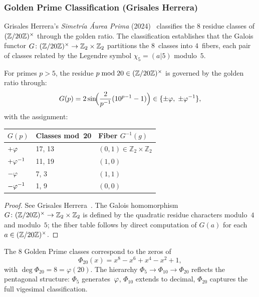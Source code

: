 \subsubsection{Golden Prime Classification (Grisales Herrera)}

Grisales Herrera's \emph{Simetría Áurea Prima} (2024)~\cite{grisales25}
classifies the $8$ residue classes of $(\mathbb{Z}/20\mathbb{Z})^\times$ through the golden ratio.
The classification establishes that the Galois functor
$G\colon(\mathbb{Z}/20\mathbb{Z})^\times\to\mathbb{Z}_2\times\mathbb{Z}_2$ partitions the
$8$~classes into $4$~fibers, each pair of classes related by the Legendre
symbol $\chi_5=(a|5)$ modulo~$5$.

\begin{Theorem}%
  \label{thm:golden-prime-classes}
For primes $p>5$, the residue $p\bmod 20\in(\mathbb{Z}/20\mathbb{Z})^\times$ is governed by the
golden ratio through:
\begin{equation}\label{eq:golden-prime-function}
  G(p) = 2\sin\!\Bigl(\frac{2}{p^{-1}}(10^{p-1}-1)\Bigr)
  \in \{\pm\varphi,\;\pm\varphi^{-1}\},
\end{equation}
with the assignment:
\begin{center}
\begin{tabular}{lll}
\toprule
$G(p)$ & Classes mod~20 & Fiber $G^{-1}(g)$ \\
\midrule
$+\varphi$   & 17, 13 & $(0,1)\in\mathbb{Z}_2\times\mathbb{Z}_2$ \\
$+\varphi^{-1}$ & 11, 19 & $(1,0)$ \\
$-\varphi$   & 7, 3   & $(1,1)$ \\
$-\varphi^{-1}$ & 1, 9   & $(0,0)$ \\
\bottomrule
\end{tabular}
\end{center}
\end{Theorem}

\begin{proof}
See Grisales Herrera~\cite{grisales25}.  The Galois homomorphism
$G\colon(\mathbb{Z}/20\mathbb{Z})^\times\to\mathbb{Z}_2\times\mathbb{Z}_2$ is defined by the
quadratic residue characters modulo~$4$ and modulo~$5$; the fiber
table follows by direct computation of $G(a)$ for each $a\in(\mathbb{Z}/20\mathbb{Z})^\times$.
\end{proof}

\begin{Proposition}\label{prop:cyclotomic}
The $8$ Golden Prime classes correspond to the zeros of
\begin{equation}\label{eq:Phi20}
  \Phi_{20}(x) = x^8 - x^6 + x^4 - x^2 + 1,
\end{equation}
with $\deg\Phi_{20} = 8 = \varphi(20)$. The hierarchy
$\Phi_5\to\Phi_{10}\to\Phi_{20}$ reflects the pentagonal structure:
$\Phi_5$ generates~$\varphi$, $\Phi_{10}$ extends to decimal, $\Phi_{20}$
captures the full vigesimal classification.
\end{Proposition}

